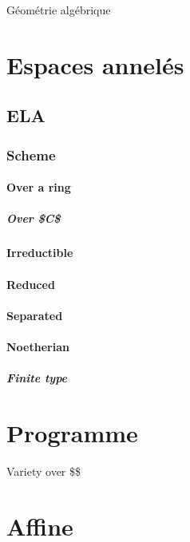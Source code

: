 Géométrie
algébrique

\chapter{Espaces annelés}

\section{ELA}

\subsection{Scheme}

\subsubsection{Over a ring}

\paragraph{Over \$C\$}

\subsubsection{Irreductible}

\subsubsection{Reduced}

\subsubsection{Separated}

\subsubsection{Noetherian}

\paragraph{Finite type}

\chapter{Programme}
Variety
over \$\C\$

\chapter{Affine}

